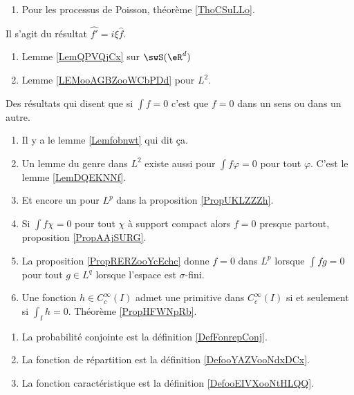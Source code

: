 \begin{enumerate}
    \item
        Pour les processus de Poisson, théorème \ref{ThoCSuLLo}.
\end{enumerate}

      \label{THEMEooJREIooKEdMOl}
Il s'agit du résultat \( \hat{f'}=i\xi \hat{f}\).
\begin{enumerate}
    \item
        Lemme \ref{LemQPVQjCx} sur \( \swS(\eR^d)\)
    \item
        Lemme \ref{LEMooAGBZooWCbPDd} pour \( L^2\).
\end{enumerate}

Des résultats qui disent que si \( \int f=0\) c'est que \( f=0\) dans un sens ou dans un autre.
\begin{enumerate}
    \item
        Il y a le lemme \ref{Lemfobnwt} qui dit ça.
    \item
        Un lemme du genre dans \( L^2\) existe aussi pour \( \int f\varphi=0\) pour tout \( \varphi\). C'est le lemme \ref{LemDQEKNNf}.
    \item
        Et encore un pour \( L^p\) dans la proposition \ref{PropUKLZZZh}.
    \item
        Si \( \int f\chi=0\) pour tout \( \chi\) à support compact alors \( f=0\) presque partout, proposition \ref{PropAAjSURG}.
    \item
        La proposition \ref{PropRERZooYcEchc} donne \( f=0\) dans \( L^p\) lorsque \( \int fg=0\) pour tout \( g\in L^q\) lorsque l'espace est \( \sigma\)-fini.
    \item
        Une fonction \( h\in C^{\infty}_c(I)\) admet une primitive dans \(  C^{\infty}_c(I)\) si et seulement si \( \int_Ih=0\). Théorème \ref{PropHFWNpRb}.
\end{enumerate}

\begin{enumerate}
    \item
        La probabilité conjointe est la définition \ref{DefFonrepConj}.
    \item
        La fonction de répartition est la définition \ref{DefooYAZVooNdxDCx}.
    \item
        La fonction caractéristique est la définition \ref{DefooEIVXooNtHLQQ}.
\end{enumerate}
